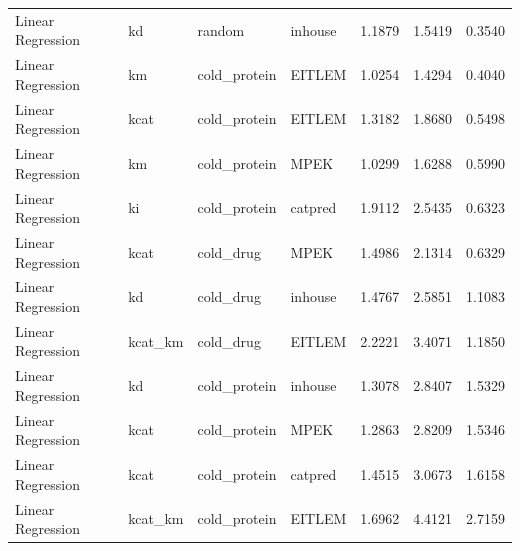 \begin{tabular}{llllrrr}
Linear Regression & kd & random & inhouse & 1.1879 & 1.5419 & 0.3540 \\
Linear Regression & km & cold_protein & EITLEM & 1.0254 & 1.4294 & 0.4040 \\
Linear Regression & kcat & cold_protein & EITLEM & 1.3182 & 1.8680 & 0.5498 \\
Linear Regression & km & cold_protein & MPEK & 1.0299 & 1.6288 & 0.5990 \\
Linear Regression & ki & cold_protein & catpred & 1.9112 & 2.5435 & 0.6323 \\
Linear Regression & kcat & cold_drug & MPEK & 1.4986 & 2.1314 & 0.6329 \\
Linear Regression & kd & cold_drug & inhouse & 1.4767 & 2.5851 & 1.1083 \\
Linear Regression & kcat_km & cold_drug & EITLEM & 2.2221 & 3.4071 & 1.1850 \\
Linear Regression & kd & cold_protein & inhouse & 1.3078 & 2.8407 & 1.5329 \\
Linear Regression & kcat & cold_protein & MPEK & 1.2863 & 2.8209 & 1.5346 \\
Linear Regression & kcat & cold_protein & catpred & 1.4515 & 3.0673 & 1.6158 \\
Linear Regression & kcat_km & cold_protein & EITLEM & 1.6962 & 4.4121 & 2.7159 \\
\bottomrule
\end{tabular}
